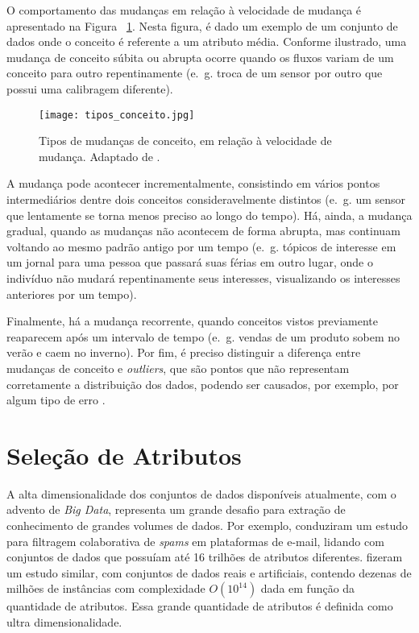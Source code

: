O comportamento das mudanças em relação à velocidade de mudança é apresentado na Figura ~\ref{fig:tipos_conceito}. Nesta figura, é dado um exemplo de um conjunto de dados onde o conceito é referente a um atributo média. Conforme ilustrado, uma mudança de conceito súbita ou abrupta ocorre quando os fluxos variam de um conceito para outro repentinamente (e.~g. troca de um sensor por outro que possui uma calibragem diferente).

\begin{figure}[!htb]
  \centering
    \texttt{[image: tipos\_conceito.jpg]}
    \caption[Tipos de mudanças de conceito, em relação à velocidade de mudança.]{Tipos de mudanças de conceito, em relação à velocidade de mudança. Adaptado de .}
    \label{fig:tipos_conceito}
\end{figure}

A mudança pode acontecer incrementalmente, consistindo em vários pontos intermediários dentre dois conceitos consideravelmente distintos (e.~g. um sensor que lentamente se torna menos preciso ao longo do tempo). Há, ainda, a mudança gradual, quando as mudanças não acontecem de forma abrupta, mas continuam voltando ao mesmo padrão antigo por um tempo (e.~g. tópicos de interesse em um jornal para uma pessoa que passará suas férias em outro lugar, onde o indivíduo não mudará repentinamente seus interesses, visualizando os interesses anteriores por um tempo). 

Finalmente, há a mudança recorrente, quando conceitos vistos previamente reaparecem após um intervalo de tempo (e.~g. vendas de um produto sobem no verão e caem no inverno). Por fim, é preciso distinguir a diferença entre mudanças de conceito e \textit{outliers}, que são pontos  que não representam corretamente a distribuição dos dados, podendo ser causados, por exemplo, por algum tipo de erro \cite{Han2006}.

\section{Seleção de Atributos}\label{sec:selecao_atributos} 

A alta dimensionalidade dos conjuntos de dados disponíveis atualmente, com o advento de \textit{Big Data}, representa um grande desafio para extração de conhecimento de grandes volumes de dados. Por exemplo,  conduziram um estudo para filtragem colaborativa de \textit{spams} em plataformas de e-mail, lidando com conjuntos de dados que possuíam até 16 trilhões de atributos diferentes.  fizeram um estudo similar, com conjuntos de dados reais e artificiais, contendo dezenas de milhões de instâncias com complexidade $O(10^{14})$ dada em função da quantidade de atributos. Essa grande quantidade de atributos é definida como ultra dimensionalidade.

